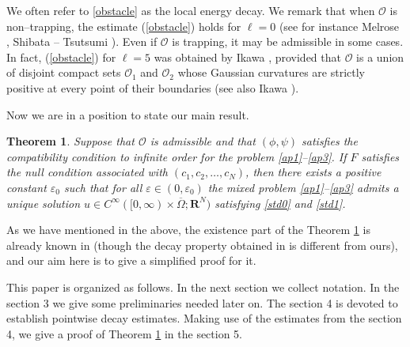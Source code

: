 \documentclass[12pt]{amsart}
\newcommand{\R}{{\mathbf R}}
\newtheorem{theorem}{Theorem}[section]
\numberwithin{equation}{section}
\begin{document}
We often refer to \eqref{obstacle} as the local energy decay. 
We remark that
when ${\mathcal O}$ is non--trapping, the estimate (\ref{obstacle}) holds for $\ell=0$
{\rm (}see for instance Melrose \cite{Mel79}, Shibata -- Tsutsumi \cite{ShiTsu83}{\rm )}.
Even if ${\mathcal O}$ is trapping, it may be admissible in some cases. 
In fact, (\ref{obstacle}) for $\ell=5$ was obtained by Ikawa \cite{Ika82},
provided that ${\mathcal O}$ is a union of disjoint compact sets ${\mathcal O}_1$ and
${\mathcal O}_2$ whose Gaussian curvatures are strictly positive at every point
of their boundaries (see also Ikawa \cite{Ika88}). 

Now we are in a position to state our main result.
\begin{theorem}\label{thm:GE}
Suppose that ${\mathcal O}$ is admissible and that
$(\phi,\psi)$ satisfies the compatibility condition
to infinite order for the problem \eqref{ap1}--\eqref{ap3}.
If $F$ satisfies the null condition associated with $(c_1, c_2, \dots, c_N)$,
then there exists a positive constant $\varepsilon_0$ such that for
all $\varepsilon \in (0,\varepsilon_0)$ the mixed problem \eqref{ap1}--\eqref{ap3}
admits a unique solution $u \in
C^\infty([0,\infty)\times \overline{\Omega}; \R^N)$ satisfying
\eqref{std0} and \eqref{std1}.
\end{theorem}

As we have mentioned in the above, 
the existence part of the Theorem \ref{thm:GE}
 is already known in \cite{MetNaSo05b}
(though the decay property obtained in \cite{MetNaSo05b} is different from ours),
and our aim here is to give a simplified proof for it.

This paper is organized as follows. In the next section we collect notation.
In the section 3 we give some preliminaries needed later on.
The section 4 is devoted to establish pointwise decay estimates. 
Making use of the estimates from the section 4, we give a proof of
Theorem \ref{thm:GE} in the section 5.
\end{document}
